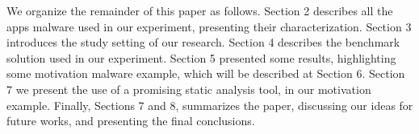 We organize the remainder of this paper as follows. Section 2 describes all the apps malware used in our experiment, presenting their characterization. Section 3 introduces the study setting of our research. Section 4 describes the benchmark solution used in our experiment. Section 5 presented some results, highlighting some motivation malware example, which will be described at Section 6. Section 7 we present the use of a promising static analysis tool, in our motivation example. Finally, Sections 7 and 8, summarizes the paper, discussing our ideas for future works, and presenting the final conclusions.
 


